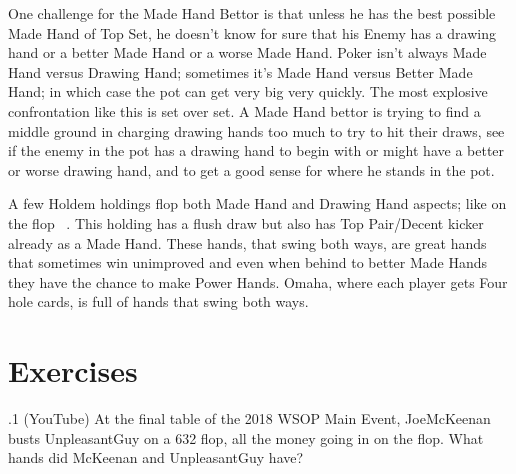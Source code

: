 One challenge for the Made Hand Bettor is that unless he has the best
possible Made Hand of Top Set, he doesn't know for sure that his
Enemy has a drawing hand or a better Made Hand or a worse Made
Hand. Poker isn't always Made Hand versus Drawing Hand; sometimes it's
Made Hand versus Better Made Hand; in which case the pot can get very
big very quickly. The most explosive confrontation like this is set
over set. A Made Hand bettor is trying to find a middle ground in
charging drawing hands too much to try to hit their draws, see if the
enemy in the pot has a drawing hand to begin with or might have a
better or worse drawing hand, and to get a good sense for where he
stands in the pot.

A few Holdem holdings flop both Made Hand and Drawing Hand aspects;
like \Kh\Th on the flop \Kc\nineh\eigh\ . This holding has a flush
draw but also has Top Pair/Decent kicker already as a Made Hand. These
hands, that swing both ways, are great hands that sometimes win
unimproved and even when behind to better Made Hands they have the
chance to make Power Hands. Omaha, where each player gets Four hole
cards, is full of hands that swing both ways.

\section{Exercises}


.1 (YouTube) At the final table of the 2018 WSOP Main
Event, JoeMcKeenan busts UnpleasantGuy on a 632 flop, all the money
going in on the flop. What hands did McKeenan and UnpleasantGuy have?
